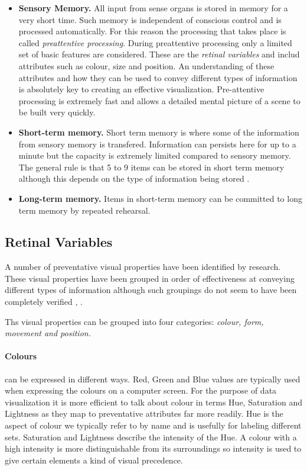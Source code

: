 \documentclass[a4paper, 11pt, titlepage, onehalfspacing]{report}
\begin{document}
\begin{itemize}
\item \textbf{Sensory Memory.} All input from sense organs is stored in memory for a very short time. Such memory is independent of conscious control and is processed automatically. For this reason the processing that takes place is called \textit{preattentive processing}. During preattentive processing only a limited set of basic features are considered. These are the \textit{retinal variables} and includ attributes such as colour, size and position. An understanding of these attributes and how they can be used to convey different types of information is absolutely key to creating an effective visualization. Pre-attentive processing is extremely fast and allows a detailed mental picture of a scene to be built very quickly.
\item \textbf{Short-term memory.} Short term memory is where some of the information from sensory memory is transfered. Information can persists here for up to a minute but the capacity is extremely limited compared to sensory memory. The general rule is that 5 to 9 items can be stored in short term memory although this depends on the type of information being stored \cite{Mil56}.
\item \textbf{Long-term memory.} Items in short-term memory can be committed to long term memory by repeated rehearsal.
\end{itemize}

\subsection{Retinal Variables}
A number of preventative visual properties have been identified by research. These visual properties have been grouped in order of effectiveness at conveying different types of information although such groupings do not seem to have been completely verified \cite{mackinlay1986automating}, \cite{mazza2009introduction}. 

Ths visual properties can be grouped into four categories: \textit{colour, form, movement and position.} 

\paragraph{Colours} can be expressed in different ways. Red, Green and Blue values are typically used when expressing the colours on a computer screen. For the purpose of data visualization it is more efficient to talk about colour in terms Hue, Saturation and Lightness as they map to preventative attributes far more readily. Hue is the aspect of colour we typically refer to by name and is usefully for labeling different sets. Saturation and Lightness describe the intensity of the Hue. A colour with a high intensity is more distinguishable from its surroundings so intensity is used to give certain elements a kind of visual precedence.
\end{document}
